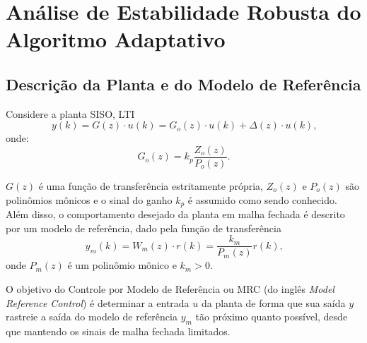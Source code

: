 
\chapter{Análise de Estabilidade Robusta do Algoritmo Adaptativo}\label{provas}


\section{Descrição da Planta e do Modelo de Referência}

    Considere a planta SISO, LTI
    \begin{equation}
        y(k) = G(z) \cdot u(k) = G_o(z) \cdot u(k) + \Delta(z) \cdot u(k)\text{,}
        \label{eq:saida_da_planta}
    \end{equation}
    onde:
    \begin{equation}
        G_o(z) = k_p \frac{Z_o(z)}{P_o(z)}\text{.}
    \end{equation}

    $G(z)$ é uma função de transferência estritamente própria, $Z_o(z)$ e $P_o(z)$ são polinômios mônicos e o sinal do ganho $k_p$ é assumido como sendo conhecido. Além disso, o comportamento desejado da planta em malha fechada é descrito por um modelo de referência, dado pela função de transferência
    \begin{equation}
        y_m(k) = W_m(z) \cdot r(k) = \frac{k_m}{P_m(z)} r(k)\text{,}
        \label{eq:saida_do_modelo_de_referencia}
    \end{equation}
    onde $P_m(z)$ é um polinômio mônico e $k_m > 0$.

    O objetivo do Controle por Modelo de Referência ou MRC (do inglês \emph{Model Reference Control}) é determinar a entrada $u$ da planta de forma que sua saída $y$ rastreie a saída do modelo de referência $y_m$ tão próximo quanto possível, desde que mantendo os sinais de malha fechada limitados.


